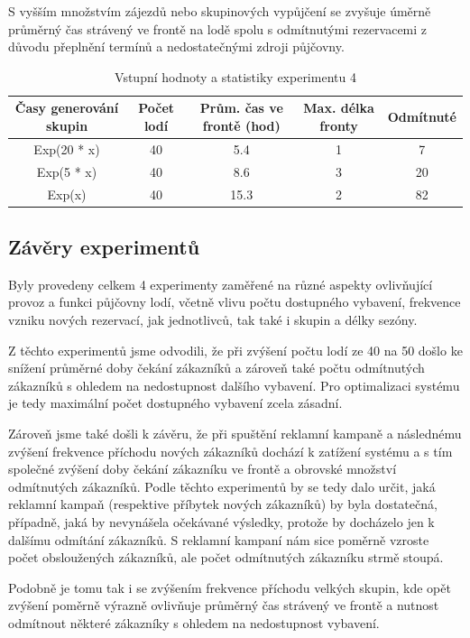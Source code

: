 \documentclass[a4paper, 12pt, hidelinks]{article}
\begin{document}
S vyšším množstvím zájezdů nebo skupinových vypůjčení se zvyšuje úměrně průměrný čas strávený ve frontě na lodě spolu s odmítnutými rezervacemi z důvodu přeplnění termínů a nedostatečnými zdroji půjčovny.
\begin{table}[h!]
    \centering
    \caption{Vstupní hodnoty a statistiky experimentu 4}
    \label{tab:simulation_stats2}
    \begin{tabular}{|c|c|c|c|c|}
        \hline
        \textbf{Časy generování skupin} & \textbf{Počet lodí} & \textbf{Prům. čas ve frontě (hod)} & \textbf{Max. délka fronty} & \textbf{Odmítnuté} \\ \hline
        Exp(20 * x) & 40 & 5.4 & 1 & 7 \\ \hline
        Exp(5 * x) & 40 & 8.6 & 3 & 20\\ \hline
        Exp(x) & 40 & 15.3 & 2 & 82 \\ \hline
    \end{tabular}
\end{table}

\subsection{Závěry experimentů}
Byly provedeny celkem 4 experimenty zaměřené na různé aspekty ovlivňující provoz a funkci půjčovny lodí, včetně vlivu počtu dostupného vybavení, frekvence vzniku nových rezervací, jak jednotlivců, tak také i skupin a délky sezóny. 

Z těchto experimentů jsme odvodili, že při zvýšení počtu lodí ze 40 na 50 došlo ke snížení průměrné doby čekání zákazníků a zároveň také počtu odmítnutých zákazníků s ohledem na nedostupnost dalšího vybavení. Pro optimalizaci systému je tedy maximální počet dostupného vybavení zcela zásadní.

Zároveň jsme také došli k závěru, že při spuštění reklamní kampaně a následnému zvýšení frekvence příchodu nových zákazníků dochází k zatížení systému a s tím společné zvýšení doby čekání zákazníku ve frontě a obrovské množství odmítnutých zákazníků. Podle těchto experimentů by se tedy dalo určit, jaká reklamní kampaň (respektive příbytek nových zákazníků) by byla dostatečná, případně, jaká by nevynášela očekávané výsledky, protože by docházelo jen k dalšímu odmítání zákazníků. S reklamní kampaní nám sice poměrně vzroste počet obsloužených zákazníků, ale počet odmítnutých zákazníku strmě stoupá.

Podobně je tomu tak i se zvýšením frekvence příchodu velkých skupin, kde opět zvýšení poměrně výrazně ovlivňuje průměrný čas strávený ve frontě a nutnost odmítnout některé zákazníky s ohledem na nedostupnost vybavení. 
\end{document}
